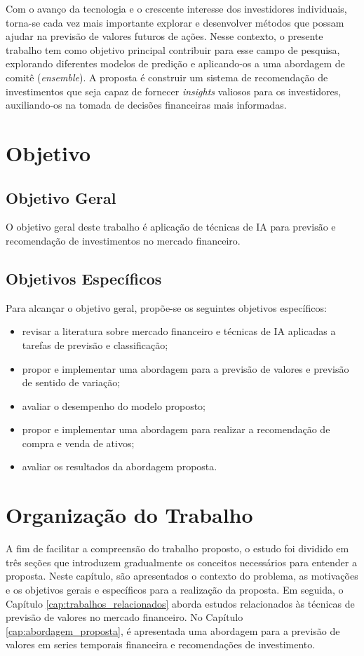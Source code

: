 Com o avanço da tecnologia e o crescente interesse dos investidores individuais, torna-se cada vez mais importante explorar e desenvolver métodos que possam ajudar na previsão de valores futuros de ações. Nesse contexto, o presente trabalho tem como objetivo principal contribuir para esse campo de pesquisa, explorando diferentes modelos de predição e aplicando-os a uma abordagem de comitê (\textit{ensemble}). A proposta é construir um sistema de recomendação de investimentos que seja capaz de fornecer \textit{insights} valiosos para os investidores, auxiliando-os na tomada de decisões financeiras mais informadas. 

\section{Objetivo}
\label{subsec:objetivo}
\subsection{Objetivo Geral}
\label{subsubsec:objetivo_geral}
O objetivo geral deste trabalho é aplicação de técnicas de \ac{IA} para previsão e recomendação de investimentos no mercado financeiro.

\subsection{Objetivos Específicos}
\label{subsubsec:objetivo_especifico}
Para alcançar o objetivo geral, propõe-se os seguintes objetivos específicos:

\begin{itemize}
    \item revisar a literatura sobre mercado financeiro e técnicas de \ac{IA} aplicadas a tarefas de previsão e classificação;
    \item propor e implementar uma abordagem para a previsão de valores e previsão de sentido de variação;
    \item avaliar o desempenho do modelo proposto;
    \item propor e implementar uma abordagem para realizar a recomendação de compra e venda de ativos;
    \item avaliar os resultados da abordagem proposta.
\end{itemize}

\section{Organização do Trabalho}
\label{subsec:organização}
A fim de facilitar a compreensão do trabalho proposto, o estudo foi dividido em três seções que introduzem gradualmente os conceitos necessários para entender a proposta. Neste capítulo, são apresentados o contexto do problema, as motivações e os objetivos gerais e específicos para a realização da proposta. Em seguida, o Capítulo \ref{cap:trabalhos_relacionados} aborda estudos relacionados às técnicas de previsão de valores no mercado financeiro. No Capítulo \ref{cap:abordagem_proposta}, é apresentada uma abordagem para a previsão de valores em series temporais financeira e recomendações de investimento.

\newpage

